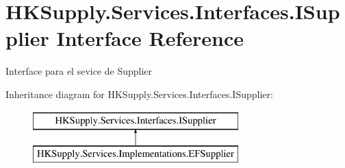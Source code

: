 \hypertarget{interface_h_k_supply_1_1_services_1_1_interfaces_1_1_i_supplier}{}\section{H\+K\+Supply.\+Services.\+Interfaces.\+I\+Supplier Interface Reference}
\label{interface_h_k_supply_1_1_services_1_1_interfaces_1_1_i_supplier}


Interface para el sevice de Supplier  


Inheritance diagram for H\+K\+Supply.\+Services.\+Interfaces.\+I\+Supplier\+:\begin{figure}[H]
\begin{center}
\leavevmode
\includegraphics[height=2.000000cm]{interface_h_k_supply_1_1_services_1_1_interfaces_1_1_i_supplier}
\end{center}
\end{figure}
